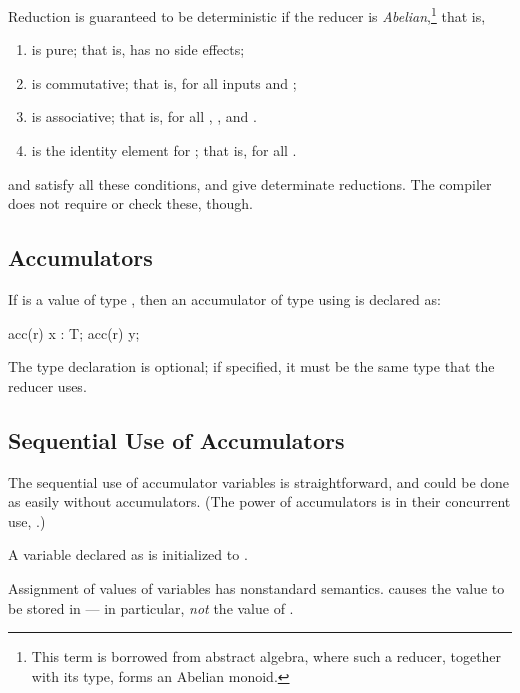 Reduction is guaranteed to be deterministic if the reducer is {\em
Abelian},\footnote{This term is borrowed from abstract algebra, where such a
reducer, together with its type, forms an Abelian monoid.}
that is, 
\begin{enumerate}
\item {} is pure; that is, has no side effects;
\item {} is commutative; that is,  for all
      inputs  and ;
\item {} is associative; that is, 
       for all , , and .
\item {} is the identity element for ; that is, 
      for all .
\end{enumerate}




 and  satisfy all these conditions, and give
determinate reductions. The compiler does not require or check these, though.


\subsection{Accumulators}

If  is a  value of type , then an accumulator of type
 using  is declared as:
\begin{xten}
acc(r) x : T;
acc(r) y; 
\end{xten}
%
The type declaration  is optional; if specified, it must be the same
type that the reducer  uses.

\subsection{Sequential Use of Accumulators}

The sequential use of accumulator variables is straightforward, and could be
done as easily without accumulators.  (The power of accumulators is in their
concurrent use, .)

A variable declared as  is initialized to .  

Assignment of values of  variables has nonstandard semantics.
 causes the value  to be stored in  --- in
particular, {\em not} the value of .


